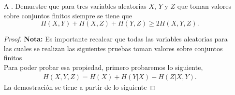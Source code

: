 \begin{enumerate}
    \item[A]. Demuestre que para tres variables aleatorias $X$, $Y$ y $Z$ que toman valores sobre conjuntos finitos siempre se tiene que 
    \[
    H(X, Y) + H(X, Z) + H(Y, Z) \geq 2H(X, Y, Z).
    \]
    \begin{proof}
    \textbf{Nota:} Es importante recalcar que todas las variables aleatorias para las cuales se realizan las siguientes pruebas toman valores sobre conjuntos finitos\\
    Para poder probar esa propiedad, primero probaremos lo siguiente, 
    \begin{align}
        H(X,Y,Z)=H(X)+H(Y|X)+H(Z|X,Y)
    .\end{align}
La demostración se tiene a partir de lo siguiente


\end{proof}
\end{enumerate}
